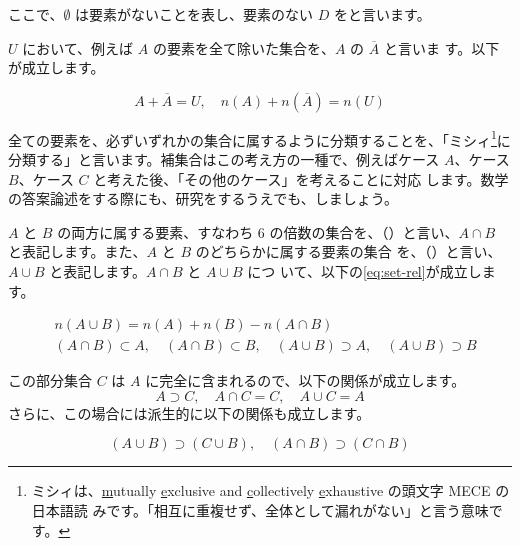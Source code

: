 ここで、$\emptyset$ は要素がないことを表し、要素のない $D$ をと言います。

$U$ において、例えば $A$ の要素を全て除いた集合を、$A$ の $\overline{A}$ と言いま す。以下が成立します。 

\begin{equation}
    A + \overline{A} = U,\quad n(A) + n(\overline{A}) = n(U) 
\end{equation}


全ての要素を、必ずいずれかの集合に属するように分類することを、「ミシ\nobreak ィ\footnote{ミシィは、\underline{m}utually \underline{e}xclusive and \underline{c}ollectively \underline{e}xhaustive の頭文字 MECE の日本語読 みです。「相互に重複せず、全体として漏れがない」と言う意味です。}に分類する」と言います。補集合はこの考え方の一種で、例えばケース $A$、ケース $B$、ケース $C$ と考えた後、「その他のケース」を考えることに対応 します。数学の答案論述をする際にも、研究をするうえでも、しましょう。 

$A$ と $B$ の両方に属する要素、すなわち 6 の倍数の集合を、（）と言い、$A \cap B$ と表記します。また、$A$ と $B$ のどちらかに属する要素の集合 を、（）と言い、$A \cup B$ と表記します。$A \cap B$ と $A \cup B$ につ いて、以下の\cref{eq:set-rel}が成立します。

\begin{equation}\label{eq:set-rel}
    \begin{split}
        &n(A \cup B) = n(A) + n(B) - n(A \cap B)\\
        &(A \cap B)\subset A,\quad(A \cap B)\subset B,\quad (A \cup B)\supset A,\quad (A \cup B)\supset B
    \end{split}
\end{equation}

この部分集合 $C$ は $A$ に完全に含まれるので、以下の関係が成立します。
\begin{equation}
    A \supset C,\quad A \cap C = C,\quad A \cup C = A
\end{equation}
さらに、この場合には派生的に以下の関係も成立します。

\begin{equation}
    (A \cup B) \supset (C \cup B),\quad (A \cap B) \supset (C \cap B)
\end{equation}

